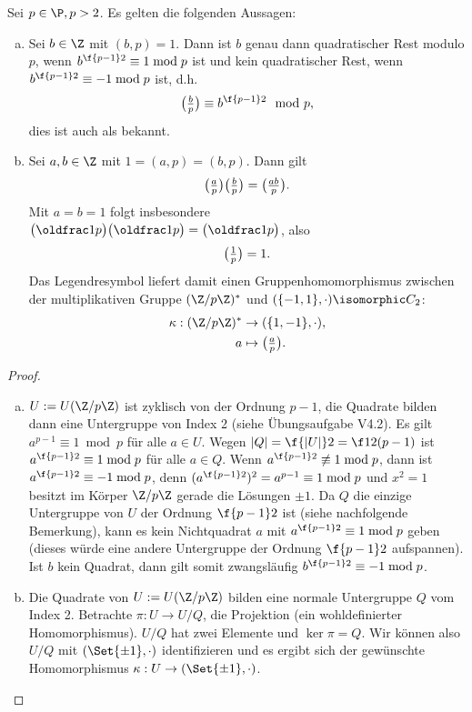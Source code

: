 \begin{lem} \label{2.14}
	Sei $p \in \P, p > 2$.
	Es gelten die folgenden Aussagen:
	\begin{enumerate}[a)]
		\item
			Sei $b \in \Z$ mit $(b, p) = 1$.
			Dann ist $b$ genau dann quadratischer Rest modulo $p$, wenn $b^{\f {p-1}2} \equiv 1 \bmod p$
			ist und kein quadratischer Rest, wenn $b^{\f {p-1}2} \equiv -1 \bmod p$	ist, d.h.
			\[
				\legsym bp \equiv b^{\f {p-1}2} \mod p,
			\]
			dies ist auch als  bekannt.
		\item
			Sei $a, b \in \Z$ mit $1 = (a,p) = (b, p)$.
			Dann gilt
			\[
				\legsym ap \legsym bp = \legsym {ab}p.
			\]
			Mit $a = b = 1$ folgt insbesondere $\legsym 1p \legsym 1p = \legsym 1p$, also
			\[
				\legsym 1p = 1.
			\]
			Das Legendresymbol liefert damit einen Gruppenhomomorphismus zwischen der multiplikativen Gruppe $(\Z / p\Z)^*$ und $(\{-1,1\}, \cdot) \isomorphic C_2$:
			\begin{align*}
				\kappa: (\Z / p\Z)^* &\to (\{1,-1\}, \cdot), \\
				a &\mapsto \legsym ap.
			\end{align*}
	\end{enumerate}
	\begin{proof}
		\begin{enumerate}[a)]
			\item
				$U := U(\Z / p\Z)$ ist zyklisch von der Ordnung $p - 1$, die Quadrate bilden dann eine Untergruppe von Index 2 (siehe Übungsaufgabe V4.2).
				Es gilt $a^{p-1} \equiv 1 \bmod p$ für alle $a \in U$.
				Wegen $|Q| = \f {|U|}2 = \f 12 (p-1)$ ist $a^{\f {p-1}2} \equiv 1 \bmod p$ für alle $a \in Q$.
				Wenn $a^{\f{p-1}2} \not\equiv 1 \bmod p$, dann ist $a^{\f{p-1}2} \equiv -1 \bmod p$, denn $(a^{\f{p-1}2})^2 = a^{p-1} \equiv 1 \bmod p$ und $x^2 = 1$ besitzt im Körper $\Z / p \Z$ gerade die Lösungen $\pm 1$.
				Da $Q$ die einzige Untergruppe von $U$ der Ordnung $\f{p-1}2$ ist (siehe nachfolgende Bemerkung), kann es kein Nichtquadrat $a$ mit $a^{\f{p-1}2} \equiv 1 \bmod p$ geben (dieses würde eine andere Untergruppe der Ordnung $\f {p-1}2$ aufspannen).
				Ist $b$ kein Quadrat, dann gilt somit zwangsläufig $b^{\f{p-1}2} \equiv -1 \bmod p$.
			\item
				Die Quadrate von $U := U(\Z / p \Z)$ bilden eine normale Untergruppe $Q$ vom Index 2.
				Betrachte $\pi: U \to U / Q$, die Projektion (ein wohldefinierter Homomorphismus).
				$U / Q$ hat zwei Elemente und $\ker \pi = Q$.
				Wir können also $U / Q$ mit $(\Set{\pm 1}, \cdot)$ identifizieren und es ergibt sich der gewünschte Homomorphismus $\kappa: U \to (\Set{\pm 1}, \cdot)$.
		\end{enumerate}
	\end{proof}
\end{lem}

